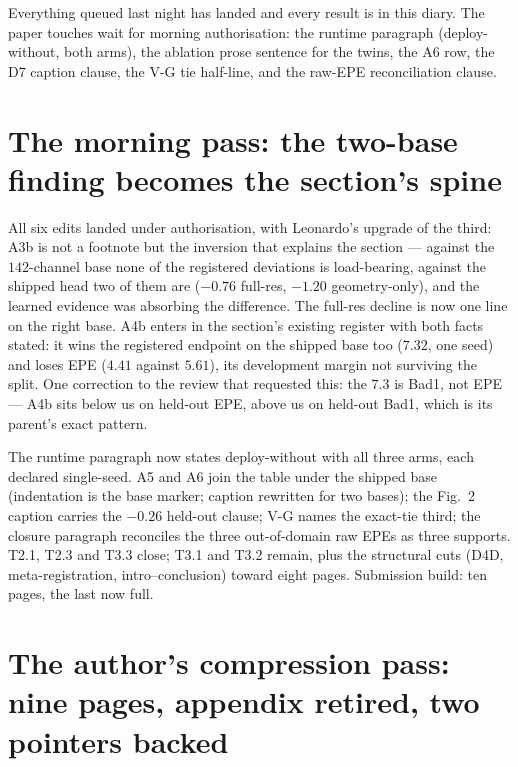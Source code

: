 \documentclass[11pt,a4paper]{article}
\begin{document}
Everything queued last night has landed and every result is in this diary.
The paper touches wait for morning authorisation: the runtime paragraph
(deploy-without, both arms), the ablation prose sentence for the twins, the
A6 row, the D7 caption clause, the V-G tie half-line, and the raw-EPE
reconciliation clause.



\section*{The morning pass: the two-base finding becomes the section's spine}

All six edits landed under authorisation, with Leonardo's upgrade of the
third: A3b is not a footnote but the inversion that explains the section ---
against the $142$-channel base none of the registered deviations is
load-bearing, against the shipped head two of them are ($-0.76$ full-res,
$-1.20$ geometry-only), and the learned evidence was absorbing the
difference. The full-res decline is now one line on the right base. A4b
enters in the section's existing register with both facts stated: it wins
the registered endpoint on the shipped base too ($7.32$, one seed) and loses
EPE ($4.41$ against $5.61$), its development margin not surviving the split.
One correction to the review that requested this: the $7.3$ is Bad1, not
EPE --- A4b sits below us on held-out EPE, above us on held-out Bad1,
which is its parent's exact pattern.

The runtime paragraph now states deploy-without with all three arms, each
declared single-seed. A5 and A6 join the table under the shipped base
(indentation is the base marker; caption rewritten for two bases); the
Fig.~2 caption carries the $-0.26$ held-out clause; V-G names the exact-tie
third; the closure paragraph reconciles the three out-of-domain raw EPEs as
three supports. T2.1, T2.3 and T3.3 close; T3.1 and T3.2 remain, plus the
structural cuts (D4D, meta-registration, intro--conclusion) toward eight
pages. Submission build: ten pages, the last now full.



\section*{The author's compression pass: nine pages, appendix retired, two pointers backed}
\end{document}
